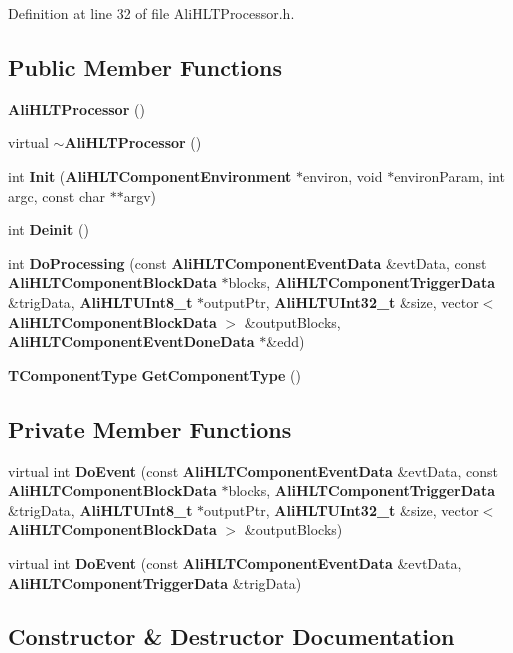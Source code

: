 Definition at line 32 of file Ali\-HLTProcessor.h.\subsection*{Public Member Functions}
\begin{CompactItemize}
\item 
{\bf Ali\-HLTProcessor} ()
\item 
virtual {\bf $\sim$Ali\-HLTProcessor} ()
\item 
int {\bf Init} ({\bf Ali\-HLTComponent\-Environment} $\ast$environ, void $\ast$environ\-Param, int argc, const char $\ast$$\ast$argv)
\item 
int {\bf Deinit} ()
\item 
int {\bf Do\-Processing} (const {\bf Ali\-HLTComponent\-Event\-Data} \&evt\-Data, const {\bf Ali\-HLTComponent\-Block\-Data} $\ast$blocks, {\bf Ali\-HLTComponent\-Trigger\-Data} \&trig\-Data, {\bf Ali\-HLTUInt8\_\-t} $\ast$output\-Ptr, {\bf Ali\-HLTUInt32\_\-t} \&size, vector$<$ {\bf Ali\-HLTComponent\-Block\-Data} $>$ \&output\-Blocks, {\bf Ali\-HLTComponent\-Event\-Done\-Data} $\ast$\&edd)
\item 
{\bf TComponent\-Type} {\bf Get\-Component\-Type} ()
\end{CompactItemize}
\subsection*{Private Member Functions}
\begin{CompactItemize}
\item 
virtual int {\bf Do\-Event} (const {\bf Ali\-HLTComponent\-Event\-Data} \&evt\-Data, const {\bf Ali\-HLTComponent\-Block\-Data} $\ast$blocks, {\bf Ali\-HLTComponent\-Trigger\-Data} \&trig\-Data, {\bf Ali\-HLTUInt8\_\-t} $\ast$output\-Ptr, {\bf Ali\-HLTUInt32\_\-t} \&size, vector$<$ {\bf Ali\-HLTComponent\-Block\-Data} $>$ \&output\-Blocks)
\item 
virtual int {\bf Do\-Event} (const {\bf Ali\-HLTComponent\-Event\-Data} \&evt\-Data, {\bf Ali\-HLTComponent\-Trigger\-Data} \&trig\-Data)
\end{CompactItemize}


\subsection{Constructor \& Destructor Documentation}

